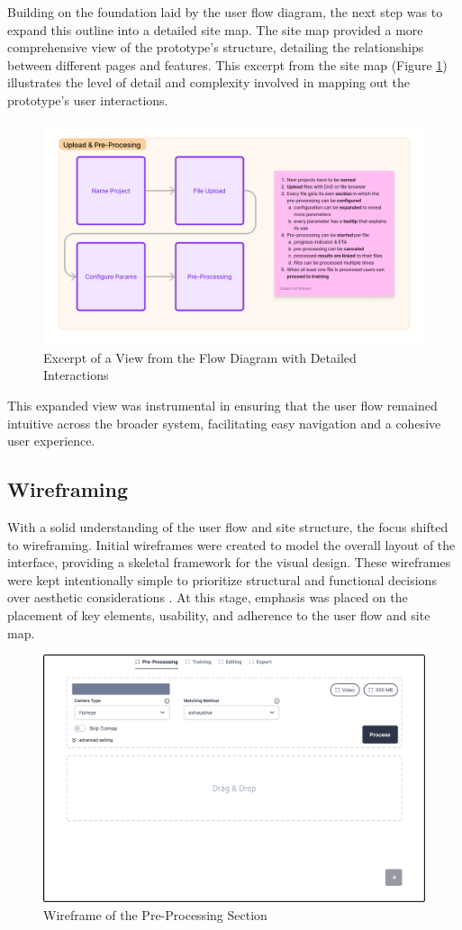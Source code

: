 Building on the foundation laid by the user flow diagram, the next step was to expand this outline into a detailed site map.
The site map provided a more comprehensive view of the prototype's structure, detailing the relationships between different pages and features.
This excerpt from the site map (Figure \ref{fig:design:flow-2}) illustrates the level of detail and complexity involved in mapping out the prototype's user interactions.

\begin{figure}[htb]
  \centering
  \includegraphics[width=.8\textwidth]{figures/flow-2.png}
  \caption{Excerpt of a View from the Flow Diagram with Detailed Interactions}
  \label{fig:design:flow-2}
\end{figure}

This expanded view was instrumental in ensuring that the user flow remained intuitive across the broader system, facilitating easy navigation and a cohesive user experience.

\subsection*{Wireframing}

With a solid understanding of the user flow and site structure, the focus shifted to wireframing.
Initial wireframes were created to model the overall layout of the interface, providing a skeletal framework for the visual design.
These wireframes were kept intentionally simple to prioritize structural and functional decisions over aesthetic considerations .
At this stage, emphasis was placed on the placement of key elements, usability, and adherence to the user flow and site map.

\begin{figure}[h!]
  \centering
  \includegraphics[width=.8\textwidth]{figures/wireframe.png}
  \caption{Wireframe of the Pre-Processing Section}
  \label{fig:design:wireframe}
\end{figure}

